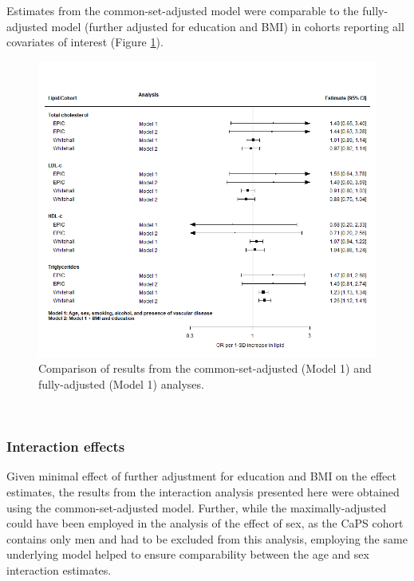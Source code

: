 \documentclass[a4paper, twoside]{templates/ociamthesis}
\begin{document}
Estimates from the common-set-adjusted model were comparable to the fully-adjusted model (further adjusted for education and BMI) in cohorts reporting all covariates of interest (Figure \ref{fig:ipdModelComparison}).





\begin{figure}[H]
\includegraphics[width=1\linewidth]{figures/ipd/main_model_comparison} \caption[Comparison of partially and maximally adjusted results]{Comparison of results from the common-set-adjusted (Model 1) and fully-adjusted (Model 1) analyses.}\label{fig:ipdModelComparison}
\end{figure}

~

\hypertarget{interaction-effects}{%
\subsubsection{Interaction effects}\label{interaction-effects}}

Given minimal effect of further adjustment for education and BMI on the effect estimates, the results from the interaction analysis presented here were obtained using the common-set-adjusted model. Further, while the maximally-adjusted could have been employed in the analysis of the effect of sex, as the CaPS cohort contains only men and had to be excluded from this analysis, employing the same underlying model helped to ensure comparability between the age and sex interaction estimates.
\end{document}
